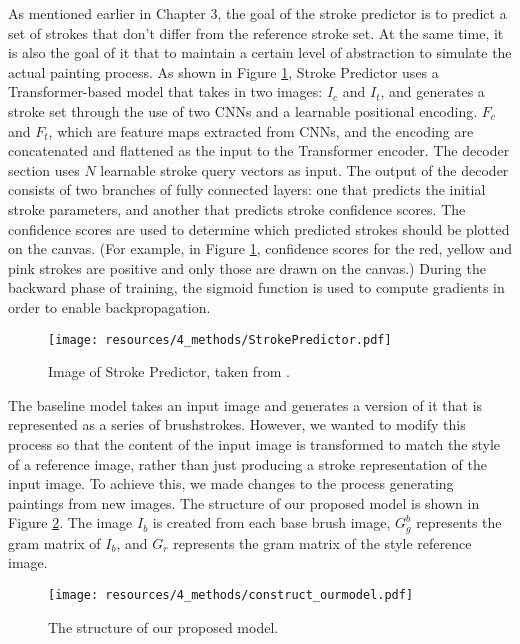 As mentioned earlier in Chapter 3, the goal of the stroke predictor is to 
predict a set of strokes that don't differ from the reference stroke set. 
At the same time, it is also the goal of it that  to maintain a certain level
of abstraction to simulate the actual painting process.
As shown in Figure \ref{StrokePredictor}, Stroke Predictor uses a Transformer-based model 
that takes in two images: $I_c$ and $I_t$, and generates a stroke set through 
the use of two CNNs and a learnable positional encoding.
$F_c$ and  $F_t$, which are feature maps extracted from CNNs, and 
the encoding are concatenated and flattened as the input to the 
Transformer encoder. The decoder section uses $N$ learnable stroke 
query vectors as input. The output of the decoder consists of two 
branches of fully connected layers: one that predicts the initial 
stroke parameters, and another that predicts stroke confidence 
scores. The confidence scores are used to determine which predicted 
strokes should be plotted on the canvas. 
(For example, in Figure \ref{StrokePredictor}, confidence scores 
for the red, yellow and pink strokes are positive and only those 
are drawn on the canvas.)
During the backward phase of training, the sigmoid function is used 
to compute gradients in order to enable backpropagation.
\begin{figure}[h]
    \centering
    \texttt{[image: resources/4\_methods/StrokePredictor.pdf]}
    \caption{
        Image of Stroke Predictor,
        taken from \cite{liu2021paint}.
    }
    \label{StrokePredictor}
\end{figure}

The baseline model takes an input image and generates a version of it that is 
represented as a series of brushstrokes.
However, we wanted to modify this process so that the content of 
the input image is transformed to match the style of a reference 
image, rather than just producing a stroke representation of the 
input image. To achieve this, we made changes to the process 
generating paintings from new images. 
The structure of our proposed model is shown in Figure \ref{Struct_ourmodel}.
The image $I_b$ is created from each base brush image, $G_g^b$ represents the 
gram matrix of $I_b$, and $G_r$ represents the gram matrix of the style 
reference image.

\begin{figure}[h]
    \centering
    \texttt{[image: resources/4\_methods/construct\_ourmodel.pdf]}
    \caption{
        The structure of our proposed model.
    }
    \label{Struct_ourmodel}
\end{figure}

